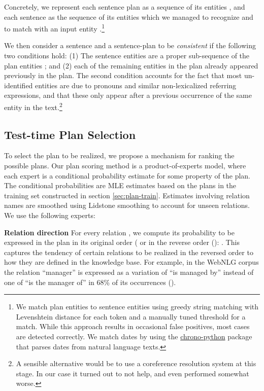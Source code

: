 \documentclass[11pt,a4paper]{article}
\begin{document}
Concretely, we represent each sentence plan as a sequence of its entities , and each sentence as the sequence of its entities which we managed to recognize and to match with an input entity .\footnote{We match plan entities to sentence entities using greedy string matching with Levenshtein distance   \cite{levenshtein1966binary} for each token and a manually tuned threshold for a match. 
While this approach results in occasional false positives, most cases are detected correctly. We match dates by using the 
\hyperlink{https://github.com/wanasit/chrono-python}{chrono-python} package that parses dates from natural language texts.}

We then consider a sentence and a sentence-plan to be \emph{consistent} if the following two conditions hold:
(1) The sentence entities  are a proper sub-sequence of the plan entities ; and (2) each of the remaining entities in the plan already appeared previously in the plan. The second condition accounts for the fact that most un-identified entities are due to pronouns and similar non-lexicalized referring expressions, and that these only appear after a previous occurrence of the same entity in the text.\footnote{A sensible alternative would be to use a coreference resolution system at this stage. In our case it turned out to not help, and even performed somewhat worse.}

\subsection{Test-time Plan Selection}\label{sec:plan-ranking}

To select the plan to be realized, we propose a mechanism for ranking the possible plans. Our plan scoring method is a product-of-experts model, where each expert is a conditional probability estimate for some property of the plan. The conditional probabilities are MLE estimates based on the plans in the training set constructed in section \ref{sec:plan-train}. Estimates involving relation names are smoothed using Lidstone smoothing to account for unseen relations.
We use the following experts:

\noindent\textbf{Relation direction} 
For every relation , we compute its probability to be expressed in the plan in its original order ( or in the reverse order (): .
This captures the tendency of certain relations to be realized in the reversed order to how they are defined in the knowledge base.
For example, in the WebNLG corpus the relation ``manager'' is expressed as a variation of ``is managed by'' instead of one of ``is the manager of'' in 68\% of its occurrences ().
\end{document}
